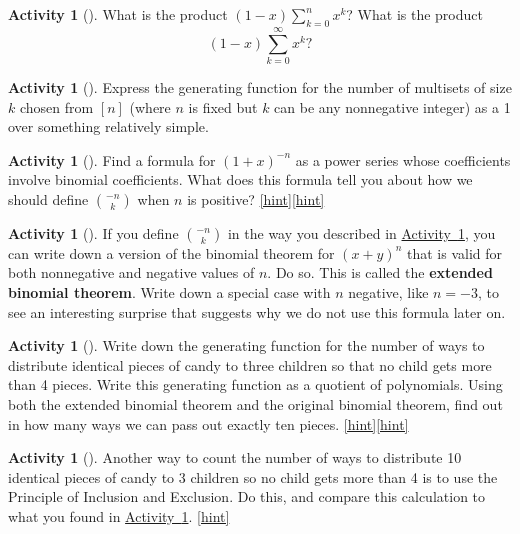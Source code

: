 \documentclass[10pt,]{book}
\newcommand{\terminology}[1]{\textbf{#1}}
\theoremstyle{plain}
\theoremstyle{definition}
\theoremstyle{definition}
\theoremstyle{definition}
\newtheorem{activity}[project]{Activity}
\numberwithin{equation}{chapter}
\begin{document}
\begin{activity}[]\label{activity-244}
\hypertarget{p-1311}{}%
What is the product \((1-x)\sum_{k=0}^n x^k\)? What is the product%
\begin{equation*}
(1-x)\sum_{k=0}^\infty x^k?
\end{equation*}
%
\end{activity}
\begin{activity}[]\label{multisetgenfn}
\hypertarget{p-1313}{}%
Express the generating function for the number of multisets of size \(k\) chosen from \([n]\) (where \(n\) is fixed but \(k\) can be any nonnegative integer) as a 1 over something relatively simple.%
\end{activity}
\begin{activity}[]\label{negnchoosek}
\hypertarget{p-1316}{}%
Find a formula for \((1+x)^{-n}\) as a power series whose coefficients involve binomial coefficients. What does this formula tell you about how we should define \(\binom{-n}{k}\) when \(n\) is positive?%
\hfill{\tiny\hyperlink{a-253}{[hint]}\hypertarget{q-253}{}}\hfill{\tiny\hyperlink{a-253}{[hint]}\hypertarget{q-253}{}}\end{activity}
\begin{activity}[]\label{activity-247}
\hypertarget{p-1320}{}%
If you define \(\binom{-n}{k}\) in the way you described in \hyperref[negnchoosek]{Activity~\ref{negnchoosek}}, you can write down a version of the binomial theorem for \((x+y)^n\) that is valid for both nonnegative and negative values of \(n\). Do so. This is called the \terminology{extended binomial theorem}. Write down a special case with \(n\) negative, like \(n=-3\), to see an interesting surprise that suggests why we do not use this formula later on.%
\end{activity}
\begin{activity}[]\label{candygenfn}
\hypertarget{p-1322}{}%
Write down the generating function for the number of ways to distribute identical pieces of candy to three children so that no child gets more than 4 pieces. Write this generating function as a quotient of polynomials. Using both the extended binomial theorem and the original binomial theorem, find out in how many ways we can pass out exactly ten pieces.%
\hfill{\tiny\hyperlink{a-255}{[hint]}\hypertarget{q-255}{}}\hfill{\tiny\hyperlink{a-255}{[hint]}\hypertarget{q-255}{}}\end{activity}
\begin{activity}[]\label{activity-249}
\hypertarget{p-1327}{}%
Another way to count the number of ways to distribute 10 identical pieces of candy to 3 children so no child gets more than 4 is to use the Principle of Inclusion and Exclusion.  Do this, and compare this calculation to what you found in \hyperref[candygenfn]{Activity~\ref{candygenfn}}.%
\hfill{\tiny\hyperlink{a-256}{[hint]}\hypertarget{q-256}{}}\end{activity}
\end{document}
